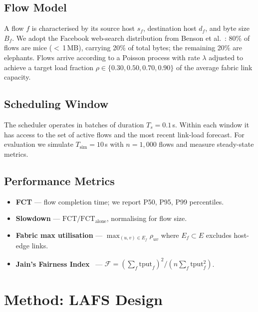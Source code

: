 \documentclass[runningheads]{llncs}
\begin{document}
\subsection{Flow Model}

A flow $f$ is characterised by its source host $s_f$, destination host $d_f$, and byte size $B_f$. We adopt the Facebook web-search distribution from Benson et al.~\cite{benson}: 80\% of flows are mice ($<$\,1\,MB), carrying 20\% of total bytes; the remaining 20\% are elephants. Flows arrive according to a Poisson process with rate $\lambda$ adjusted to achieve a target load fraction $\rho \in \{0.30, 0.50, 0.70, 0.90\}$ of the average fabric link capacity.

\subsection{Scheduling Window}

The scheduler operates in batches of duration $T_s = 0.1$\,s. Within each window it has access to the set of active flows and the most recent link-load forecast. For evaluation we simulate $T_{\text{sim}} = 10$\,s with $n = 1{,}000$ flows and measure steady-state metrics.

\subsection{Performance Metrics}

\begin{itemize}
  \item \textbf{FCT} — flow completion time; we report P50, P95, P99 percentiles.
  \item \textbf{Slowdown} — $\text{FCT} / \text{FCT}_{\text{alone}}$, normalising for flow size.
  \item \textbf{Fabric max utilisation} — $\max_{(u,v) \in E_f} \rho_{uv}$ where $E_f \subset E$ excludes host-edge links.
  \item \textbf{Jain's Fairness Index}~\cite{jain} — $\mathcal{F} = (\sum_f \text{tput}_f)^2 / (n \sum_f \text{tput}_f^2)$.
\end{itemize}

\section{Method: LAFS Design}
\label{sec:method}
\end{document}
